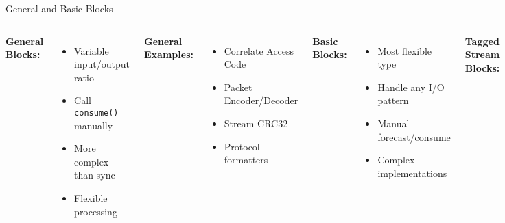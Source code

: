 \documentclass[aspectratio=169,11pt]{beamer}
\begin{document}
\begin{frame}{General and Basic Blocks}
\begin{columns}
\textbf{General Blocks:}
\begin{itemize}
    \item Variable input/output ratio
    \item Call \texttt{consume()} manually
    \item More complex than sync
    \item Flexible processing
\end{itemize}

\textbf{General Examples:}
\begin{itemize}
    \item Correlate Access Code
    \item Packet Encoder/Decoder
    \item Stream CRC32
    \item Protocol formatters
\end{itemize}

\textbf{Basic Blocks:}
\begin{itemize}
    \item Most flexible type
    \item Handle any I/O pattern
    \item Manual forecast/consume
    \item Complex implementations
\end{itemize}

\textbf{Tagged Stream Blocks:}
\begin{itemize}
    \item Length-tagged packets
    \item Process complete bursts
    \item Preserve packet boundaries
    \item Used in packet radio
\end{itemize}
\end{columns}
\end{frame}
\end{document}
